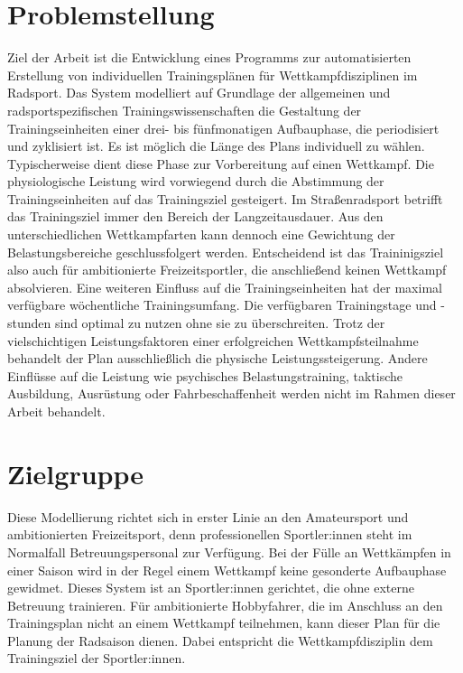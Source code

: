 \section{Problemstellung}
\label{sec:einleitung:problem}
Ziel der Arbeit ist die Entwicklung eines Programms zur automatisierten Erstellung von individuellen Trainingsplänen für Wettkampfdisziplinen im Radsport.
Das System modelliert auf Grundlage der allgemeinen und radsportspezifischen Trainingswissenschaften die Gestaltung der Trainingseinheiten einer drei- bis fünfmonatigen Aufbauphase, die periodisiert und zyklisiert ist. Es ist möglich die Länge des Plans individuell zu wählen. 
Typischerweise dient diese Phase zur Vorbereitung auf einen Wettkampf. Die physiologische Leistung wird vorwiegend durch die Abstimmung der Trainingseinheiten auf das Trainingsziel gesteigert. Im Straßenradsport betrifft das Trainingsziel immer den Bereich der Langzeitausdauer. Aus den unterschiedlichen Wettkampfarten kann dennoch eine Gewichtung der Belastungsbereiche geschlussfolgert werden. Entscheidend ist das Traininigsziel also auch für ambitionierte Freizeitsportler, die anschließend keinen Wettkampf absolvieren.\newline
Eine weiteren Einfluss auf die Trainingseinheiten hat der maximal verfügbare wöchentliche Trainingsumfang. Die verfügbaren Trainingstage und -stunden sind optimal zu nutzen ohne sie zu überschreiten. 
Trotz der vielschichtigen Leistungsfaktoren einer erfolgreichen Wettkampfsteilnahme behandelt der Plan ausschließlich die physische Leistungssteigerung. Andere Einflüsse auf die Leistung wie psychisches Belastungstraining, taktische Ausbildung, Ausrüstung oder Fahrbeschaffenheit \cite[13-15]{Radsporttraining} werden nicht im Rahmen dieser Arbeit behandelt.

\section{Zielgruppe}
Diese Modellierung richtet sich in erster Linie an den Amateursport und ambitionierten Freizeitsport, denn professionellen Sportler:innen steht im Normalfall Betreuungspersonal zur Verfügung. Bei der Fülle an Wettkämpfen in einer Saison wird in der Regel einem Wettkampf keine gesonderte Aufbauphase gewidmet. Dieses System ist an Sportler:innen gerichtet, die ohne externe Betreuung trainieren. Für ambitionierte Hobbyfahrer, die im Anschluss an den Trainingsplan nicht an einem Wettkampf teilnehmen, kann dieser Plan für die Planung der Radsaison dienen. Dabei entspricht die Wettkampfdisziplin dem Trainingsziel der Sportler:innen.

